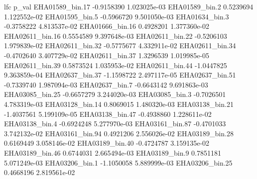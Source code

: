 \documentclass[
]{book}
\newenvironment{Shaded}{\begin{snugshade}}{\end{snugshade}}
\newcommand{\NormalTok}[1]{#1}
\begin{document}
\begin{Shaded}
\begin{Highlighting}[]
\NormalTok{                       lfc        p\_val}
\NormalTok{EHA01589\_bin.17 {-}0.9158390 1.023025e{-}03}
\NormalTok{EHA01589\_bin.2   0.5239694 1.122552e{-}02}
\NormalTok{EHA01595\_bin.5  {-}0.5966720 9.501050e{-}03}
\NormalTok{EHA01634\_bin.3  {-}0.3758222 4.813537e{-}02}
\NormalTok{EHA01666\_bin.16  0.4928201 1.377360e{-}02}
\NormalTok{EHA02611\_bin.16  0.5554589 9.397648e{-}03}
\NormalTok{EHA02611\_bin.22 {-}0.5206103 1.979839e{-}02}
\NormalTok{EHA02611\_bin.32 {-}0.5775677 4.332911e{-}02}
\NormalTok{EHA02611\_bin.34 {-}0.4702640 3.407729e{-}02}
\NormalTok{EHA02611\_bin.37  1.3296539 1.019985e{-}05}
\NormalTok{EHA02611\_bin.39  0.5873524 1.035953e{-}02}
\NormalTok{EHA02611\_bin.44 {-}1.0447825 9.363859e{-}04}
\NormalTok{EHA02637\_bin.37 {-}1.1598722 2.497117e{-}05}
\NormalTok{EHA02637\_bin.51 {-}0.7339740 1.987094e{-}03}
\NormalTok{EHA02637\_bin.7  {-}0.6643142 9.691863e{-}03}
\NormalTok{EHA03085\_bin.25 {-}0.6657279 3.244020e{-}03}
\NormalTok{EHA03085\_bin.3  {-}0.7026501 4.783319e{-}03}
\NormalTok{EHA03128\_bin.14  0.8069015 1.480320e{-}03}
\NormalTok{EHA03138\_bin.21 {-}1.4037561 5.199109e{-}05}
\NormalTok{EHA03138\_bin.47 {-}0.4938860 1.228611e{-}02}
\NormalTok{EHA03138\_bin.4  {-}0.6924248 5.277970e{-}03}
\NormalTok{EHA03161\_bin.87 {-}0.4701033 3.742132e{-}02}
\NormalTok{EHA03161\_bin.94  0.4921206 2.556026e{-}02}
\NormalTok{EHA03189\_bin.28  0.6169449 3.058146e{-}02}
\NormalTok{EHA03189\_bin.40 {-}0.4724787 3.159135e{-}02}
\NormalTok{EHA03189\_bin.46  0.6744031 2.665494e{-}03}
\NormalTok{EHA03189\_bin.9   0.7851181 5.071249e{-}03}
\NormalTok{EHA03206\_bin.1  {-}1.1050058 5.889999e{-}03}
\NormalTok{EHA03206\_bin.25  0.4668196 2.819561e{-}02}
\end{Highlighting}
\end{Shaded}
\end{document}
